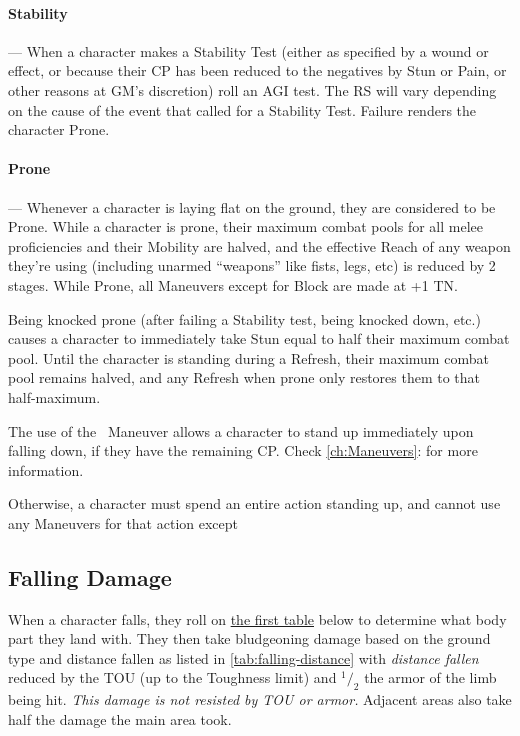 \documentclass[oneside,11pt,english]{book}
\newcommand*\rfrac[2]{{}^{#1}\!/_{#2}}
\begin{document}
\paragraph{\label{par:Stability}Stability}---\quad
When a character makes a Stability Test (either as specified by a wound or effect, or because their CP has been reduced to the negatives by Stun or Pain, or other reasons at GM’s discretion) roll an AGI test. The RS will vary depending on the cause of the event that called for a Stability Test. Failure renders the character Prone.

\paragraph{\label{par:Prone}Prone}---\quad
Whenever a character is laying flat on the ground, they are considered to be Prone. While a character is prone, their maximum combat pools for all melee proficiencies and their Mobility are halved, and the effective Reach of any weapon they’re using (including unarmed “weapons” like fists, legs, etc) is reduced by 2 stages. While Prone, all Maneuvers except for Block are made at +1 TN.

Being knocked prone (after failing a Stability test, being knocked down, etc.) causes a character to immediately take Stun equal to half their maximum combat pool. Until the character is standing during a Refresh, their maximum combat pool remains halved, and any Refresh when prone only restores them to that half-maximum.

The use of the ~Maneuver allows a character to stand up immediately upon falling down, if they have the remaining CP. Check \autoref{ch:Maneuvers}:  for more information. 

Otherwise, a character must spend an entire action standing up, and cannot use any Maneuvers for that action except 

\subsection{Falling Damage}\label{sec:falling-damage}
When a character falls, they roll on \hyperref[tab:falling-damage-hit-location]{the first table} below to determine what body part they
land with. They then take bludgeoning damage based on the ground type and
distance fallen as listed in \autoref{tab:falling-distance} with \emph{distance
  fallen} reduced by the TOU (up to the Toughness limit) and $\rfrac{1}{2}$ the
armor of the limb being hit. \emph{This damage is not resisted by TOU or armor.}
Adjacent areas also take half the damage the main area took. 
\end{document}
